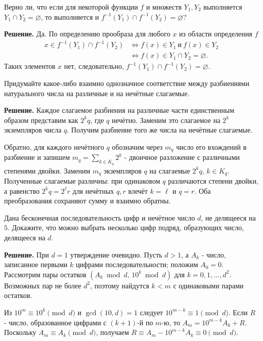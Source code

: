 \begin{problems}
\item Верно ли, что если для некоторой функции $f$ и множеств $Y_1,Y_2$ выполняется $Y_1\cap Y_2=\varnothing$, то выполняется и $f^{-1}(Y_1)\cap f^{-1}(Y_2)=\varnothing$?
\par\smallskip\noindent\textbf{Решение.} Да. По определению прообраза для любого $x$ из области определения $f$
\[
\begin{aligned}
x\in f^{-1}(Y_1)\cap f^{-1}(Y_2)
&\iff f(x)\in Y_1\ \text{и}\ f(x)\in Y_2\\
&\iff f(x)\in Y_1\cap Y_2=\varnothing.
\end{aligned}
\]
Таких элементов $x$ нет, следовательно, $f^{-1}(Y_1)\cap f^{-1}(Y_2)=\varnothing$.\par

\item Придумайте какое-либо взаимно однозначное соответствие между разбиениями натурального числа на различные и на нечётные слагаемые.
\par\smallskip\noindent\textbf{Решение.} Каждое слагаемое разбиения на различные части единственным образом представим как $2^kq$, где $q$ нечётно. Заменим это слагаемое на $2^k$ экземпляров числа $q$. Получим разбиение того же числа на нечётные слагаемые.
\par Обратно, для каждого нечётного $q$ обозначим через $m_q$ число его вхождений в разбиение и запишем $m_q=\sum_{k\in K_q}2^k$ - двоичное разложение с различными степенями двойки. Заменим $m_q$ экземпляров $q$ на слагаемые $2^kq$, $k\in K_q$. Полученные слагаемые различны: при одинаковом $q$ различаются степени двойки, а равенство $2^kq=2^\ell r$ для нечётных $q,r$ влечёт $k=\ell$ и $q=r$. Оба преобразования сохраняют сумму и взаимно обратны.\par

\item Дана бесконечная последовательность цифр и нечётное число $d$, не делящееся на $5$. Докажите, что можно выбрать несколько цифр подряд, образующих число, делящееся на $d$.
\par\smallskip\noindent\textbf{Решение.} При $d=1$ утверждение очевидно. Пусть $d>1$, а $A_k$ - число, записанное первыми $k$ цифрами последовательности; положим $A_0=0$. Рассмотрим пары остатков $(A_k\bmod d,\,10^k\bmod d)$ для $k=0,1,\ldots,d^2$. Возможных пар не более $d^2$, поэтому найдутся $k<m$ с одинаковыми парами остатков.
\par Из $10^m\equiv10^k\pmod d$ и $\gcd(10,d)=1$ следует $10^{m-k}\equiv1\pmod d$. Если $R$ - число, образованное цифрами с $(k+1)$-й по $m$-ю, то $A_m=10^{m-k}A_k+R$. Поскольку $A_m\equiv A_k\pmod d$, получаем $R\equiv A_m-10^{m-k}A_k\equiv0\pmod d$.\par


\end{problems}
